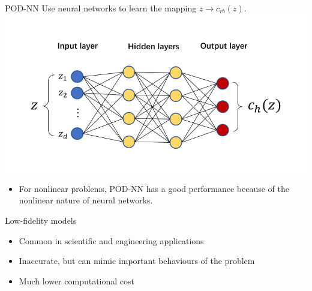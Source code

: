 \documentclass[10pt]{beamer}
\begin{document}
\begin{frame}{POD-NN}
Use neural networks to learn the mapping $z \to c_{rb}(z)$\cite{hesthaven2018non}.
\includegraphics[scale=0.6]{figures/PODNN.pdf}

\begin{itemize}
\item For nonlinear problems, POD-NN has a good performance because of the nonlinear nature of neural networks.
\end{itemize}

\end{frame}

\begin{frame}{Low-fidelity models}
\begin{itemize}
\item Common in scientific and engineering applications
\item Inaccurate, but can mimic important behaviours of the problem
\item Much lower computational cost
\end{itemize}

\end{frame}
\end{document}
